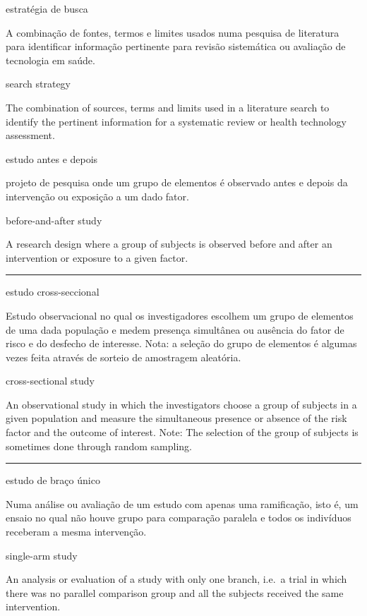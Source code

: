 \documentclass[
  openany]{book}
\begin{document}
estratégia de busca

A combinação de fontes, termos e limites usados numa pesquisa de literatura para identificar informação pertinente para revisão sistemática ou avaliação de tecnologia em saúde.

search strategy

The combination of sources, terms and limits used in a literature search to identify the pertinent information for a systematic review or health technology assessment.

estudo antes e depois

projeto de pesquisa onde um grupo de elementos é observado antes e depois da intervenção ou exposição a um dado fator.

before-and-after study

A research design where a group of subjects is observed before and after an intervention or exposure to a given factor.

\begin{center}\rule{0.5\linewidth}{0.5pt}\end{center}

estudo cross-seccional

Estudo observacional no qual os investigadores escolhem um grupo de elementos de uma dada população e medem presença simultânea ou ausência do fator de risco e do desfecho de interesse. Nota: a seleção do grupo de elementos é algumas vezes feita através de sorteio de amostragem aleatória.

cross-sectional study

An observational study in which the investigators choose a group of subjects in a given population and measure the simultaneous presence or absence of the risk factor and the outcome of interest. Note: The selection of the group of subjects is sometimes done through random sampling.

\begin{center}\rule{0.5\linewidth}{0.5pt}\end{center}

estudo de braço único

Numa análise ou avaliação de um estudo com apenas uma ramificação, isto é, um ensaio no qual não houve grupo para comparação paralela e todos os indivíduos receberam a mesma intervenção.

single-arm study

An analysis or evaluation of a study with only one branch, i.e.~a trial in which there was no parallel comparison group and all the subjects received the same intervention.
\end{document}
